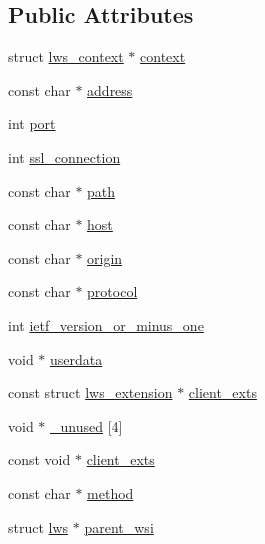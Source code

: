 \subsection*{Public Attributes}
\begin{DoxyCompactItemize}
\item 
struct \hyperlink{structlws__context}{lws\+\_\+context} $\ast$ \hyperlink{structlws__client__connect__info_af7a54f6f3291d09a4123cbf014ee1f14}{context}
\item 
const char $\ast$ \hyperlink{structlws__client__connect__info_a1de593a0b98db84031b665bdc4ba51d2}{address}
\item 
int \hyperlink{structlws__client__connect__info_a1af124d81c3c22a46d39387c5bc3d6b9}{port}
\item 
int \hyperlink{structlws__client__connect__info_a9862297827639238a7a0b4054c3ddf3d}{ssl\+\_\+connection}
\item 
const char $\ast$ \hyperlink{structlws__client__connect__info_a4490dc65b713e4c02b29a4093dc15e9b}{path}
\item 
const char $\ast$ \hyperlink{structlws__client__connect__info_a54627db2127144b8598d5a1ce0252443}{host}
\item 
const char $\ast$ \hyperlink{structlws__client__connect__info_a41fdf5d10fb4a7521f5ea6d15f323f99}{origin}
\item 
const char $\ast$ \hyperlink{structlws__client__connect__info_a2d88ca3e89efeda405e3c13cc9cb7344}{protocol}
\item 
int \hyperlink{structlws__client__connect__info_a69abb5aeed755750b9755e5c91db6895}{ietf\+\_\+version\+\_\+or\+\_\+minus\+\_\+one}
\item 
void $\ast$ \hyperlink{structlws__client__connect__info_a40117288cbea5439b3fc5cd95f1aea3c}{userdata}
\item 
const struct \hyperlink{structlws__extension}{lws\+\_\+extension} $\ast$ \hyperlink{structlws__client__connect__info_a26c8775e587155f98bd562a893f8e2d4}{client\+\_\+exts}
\item 
void $\ast$ \hyperlink{structlws__client__connect__info_a4ab4a7e1a248e7fdaab5f89a2bf4ed28}{\+\_\+unused} \mbox{[}4\mbox{]}
\item 
const void $\ast$ \hyperlink{structlws__client__connect__info_aaf76f45db5b4354894bae03a4f8f65a5}{client\+\_\+exts}
\item 
const char $\ast$ \hyperlink{structlws__client__connect__info_a1f4d5a279436c0c2fe065c44ea96b38f}{method}
\item 
struct \hyperlink{structlws}{lws} $\ast$ \hyperlink{structlws__client__connect__info_a32fc3fb0fe139185dd3288a371c87407}{parent\+\_\+wsi}

\end{DoxyCompactItemize}
